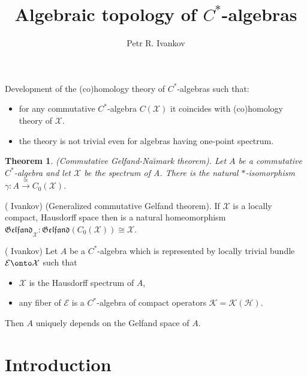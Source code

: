 \documentclass{beamer}
\title{Algebraic topology of $C^*$-algebras}
\institute
{
Algebreas in analisys\\
https://arxiv.org/abs/2511.09189
}
\author{Petr R. Ivankov  }
\theoremstyle{plain}
\newtheorem{thm}{Theorem}%
\newcommand{\K}{\mathcal{K}}
\newcommand{\E}{\mathcal{E}}
\newcommand{\sH}{\mathcal{H}}       %
\newcommand{\sX}{\mathcal{X}}       %
\begin{document}
\begin{frame}
  \titlepage
\end{frame}

\begin{frame}
Development of the (co)homology theory of $C^*$-algebras such that: 
\begin{itemize}
	\item for any commutative $C^*$-algebra $C\left(\sX \right)$ it coincides with  (co)homology theory of $\sX$.
	\item the theory is not trivial even for algebras having one-point  spectrum.
\end{itemize}
\end{frame}
\begin{frame}
	\begin{thm}\label{gelfand-naimark_I_thm} (Commutative Gelfand-Na\u{\i}mark theorem). 
		Let $A$ be a commutative $C^*$-algebra and let $\mathcal{X}$ be the spectrum of A. There is the natural $*$-isomorphism $\gamma:A \xrightarrow{\cong} C_0(\mathcal{X})$.
	\end{thm}
	\begin{lemma}\label{lem_g_i_lem} (\alert{ Ivankov}) (Generalized commutative Gelfand theorem).
		If $\sX$ is a locally compact, Hausdorff space then  is a natural  homeomorphism $ \mathfrak{Gelfand}_\sX: \mathfrak{Gelfand}\left(C_0\left( \sX\right)  \right)\cong \sX$.
	\end{lemma}
		\begin{lemma} (\alert{ Ivankov}) Let $A$ be a $C^*$-algebra which is represented by locally trivial bundle $\E\onto \sX$ such that
			\begin{itemize}
				\item $\sX$ is the Hausdorff spectrum of $A$,
				\item any fiber of $\E$ is a $C^*$-algebra of compact operators $\K = \K\left(\sH \right)$. 
			\end{itemize}
			Then $A$ uniquely depends on the Gelfand space of $A$.
	\end{lemma}
	
	
	
\end{frame}
\section{Introduction}

	
\end{document}
